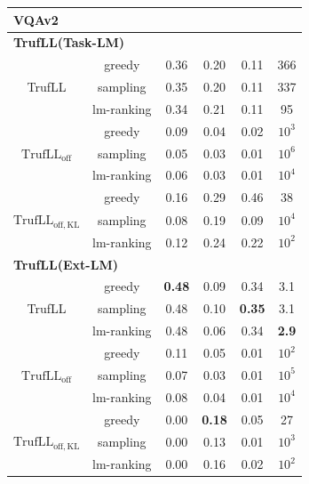 \documentclass{article}
\newcommand{\algo}{TrufLL\xspace}
\begin{document}
\begin{table}[h!]
\begin{tabularx}{0.6\textwidth}{cc|c|ccc}
\toprule
\multicolumn{6}{l}{\textbf{VQAv2}} \\
\hline
\hline
\multicolumn{4}{l}{\textbf{\algo(Task-LM)}} \\
\midrule
 & greedy & 0.36 & 0.20 & 0.11 & 366 \\
\algo & sampling & 0.35 & 0.20 & 0.11 & 337 \\
             & lm-ranking & 0.34 & 0.21 & 0.11 & 95 \\
\hline
\hline
 & greedy & 0.09 & 0.04 & 0.02 & $10^3$ \\
$\mathrm{\algo}_{\mathrm{off}}$  & sampling  & 0.05 & 0.03 & 0.01 & $10^6$ \\
                 & lm-ranking & 0.06 & 0.03 & 0.01 & $10^4$ \\
\hline
& greedy &  0.16 & 0.29 &  0.46 &  38 \\
$\mathrm{\algo}_{\mathrm{off,KL}}$ & sampling & 0.08 &  0.19 & 0.09 & $10^4$ \\
                 & lm-ranking & 0.12 & 0.24 &  0.22 &  $10^2$ \\
\midrule
\multicolumn{4}{l}{\textbf{\algo(Ext-LM)}} \\
\hline
& greedy & \textbf{0.48} & 0.09& 0.34&	3.1 \\
\algo & sampling & 0.48 &	0.10 & \textbf{0.35} & 3.1 \\
            & lm-ranking & 0.48 & 0.06 & 0.34 &	\textbf{2.9} \\
\hline
\hline
& greedy & 0.11 & 0.05 & 0.01 & $10^2$ \\
$\mathrm{\algo}_{\mathrm{off}}$ & sampling  & 0.07 & 0.03 & 0.01 & $10^5$ \\
            & lm-ranking & 0.08 & 0.04 & 0.01 & $10^4$ \\
\hline
& greedy & 0.00 &  \textbf{0.18}  & 0.05 &  27 \\
$\mathrm{\algo}_{\mathrm{off,KL}}$ & sampling & 0.00 & 0.13 &  0.01 &  $10^3$ \\
                 & lm-ranking & 0.00 & 0.16 & 0.02 & $10^2$ \\
\bottomrule
\end{tabularx}
\end{table}

\FloatBarrier
\end{document}
